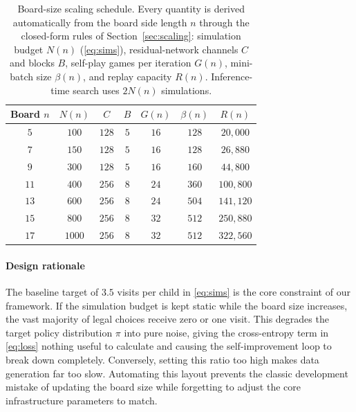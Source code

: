 \documentclass[conference]{IEEEtran}
\begin{document}
\begin{table}[htbp]
  \caption{Board-size scaling schedule. Every quantity is derived automatically
  from the board side length $n$ through the closed-form rules of
  Section~\ref{sec:scaling}: simulation budget $N(n)$ (\eqref{eq:sims}),
  residual-network channels $C$ and blocks $B$, self-play games per iteration
  $G(n)$, mini-batch size $\beta(n)$, and replay capacity $R(n)$. Inference-time
  search uses $2N(n)$ simulations.}
  \label{tab:scaling}
  \centering
  \footnotesize
  \setlength{\tabcolsep}{4.5pt}
  \begin{tabular}{ccccccc}
    \toprule
    Board $n$ & $N(n)$ & $C$ & $B$ & $G(n)$ & $\beta(n)$ & $R(n)$ \\
    \midrule
    $5$  & $100$   & $128$ & $5$ & $16$ & $128$ & $20{,}000$ \\
    $7$  & $150$   & $128$ & $5$ & $16$ & $128$ & $26{,}880$ \\
    $9$  & $300$   & $128$ & $5$ & $16$ & $160$ & $44{,}800$ \\
    $11$ & $400$   & $256$ & $8$ & $24$ & $360$ & $100{,}800$ \\
    $13$ & $600$   & $256$ & $8$ & $24$ & $504$ & $141{,}120$ \\
    $15$ & $800$   & $256$ & $8$ & $32$ & $512$ & $250{,}880$ \\
    $17$ & $1000$  & $256$ & $8$ & $32$ & $512$ & $322{,}560$ \\
    \bottomrule
  \end{tabular}
\end{table}

\paragraph{Design rationale} The baseline target of $3.5$ visits per child in \eqref{eq:sims} is the core constraint of our framework. If the simulation budget is kept static while the board size increases, the vast majority of legal choices receive zero or one visit. This degrades the target policy distribution $\pi$ into pure noise, giving the cross-entropy term in \eqref{eq:loss} nothing useful to calculate and causing the self-improvement loop to break down completely. Conversely, setting this ratio too high makes data generation far too slow. Automating this layout prevents the classic development mistake of updating the board size while forgetting to adjust the core infrastructure parameters to match.
\end{document}
